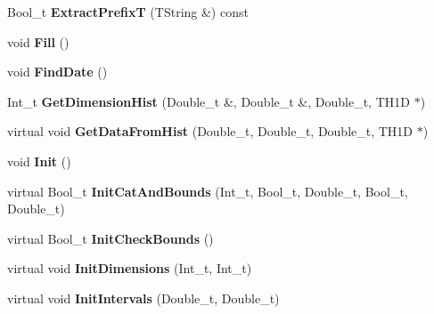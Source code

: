 \begin{DoxyCompactItemize}
\item 
\hypertarget{classTSplineFit_ab98f8db9598a8836d12f52d3aa239d29}{Bool\-\_\-t {\bfseries Extract\-Prefix\-T} (T\-String \&) const }\label{classTSplineFit_ab98f8db9598a8836d12f52d3aa239d29}

\item 
\hypertarget{classTSplineFit_a1d26dd47cf5a5579d25f85eef97d887c}{void {\bfseries Fill} ()}\label{classTSplineFit_a1d26dd47cf5a5579d25f85eef97d887c}

\item 
\hypertarget{classTSplineFit_a93710001f7a21650284d359f9c517b7d}{void {\bfseries Find\-Date} ()}\label{classTSplineFit_a93710001f7a21650284d359f9c517b7d}

\item 
\hypertarget{classTSplineFit_a43cfe894d82a8765ca1aae65bc1057d8}{Int\-\_\-t {\bfseries Get\-Dimension\-Hist} (Double\-\_\-t \&, Double\-\_\-t \&, Double\-\_\-t, T\-H1\-D $\ast$)}\label{classTSplineFit_a43cfe894d82a8765ca1aae65bc1057d8}

\item 
\hypertarget{classTSplineFit_a6f1ea5503e61b7c5219ceaf0ce869469}{virtual void {\bfseries Get\-Data\-From\-Hist} (Double\-\_\-t, Double\-\_\-t, Double\-\_\-t, T\-H1\-D $\ast$)}\label{classTSplineFit_a6f1ea5503e61b7c5219ceaf0ce869469}

\item 
\hypertarget{classTSplineFit_ad184ed1b147d7ac8ba4d0f837636c6a8}{void {\bfseries Init} ()}\label{classTSplineFit_ad184ed1b147d7ac8ba4d0f837636c6a8}

\item 
\hypertarget{classTSplineFit_a07376883cd96d9a26f14204f31ccb6b6}{virtual Bool\-\_\-t {\bfseries Init\-Cat\-And\-Bounds} (Int\-\_\-t, Bool\-\_\-t, Double\-\_\-t, Bool\-\_\-t, Double\-\_\-t)}\label{classTSplineFit_a07376883cd96d9a26f14204f31ccb6b6}

\item 
\hypertarget{classTSplineFit_a89067f9c9aa9d7b3d517fc0780cde71b}{virtual Bool\-\_\-t {\bfseries Init\-Check\-Bounds} ()}\label{classTSplineFit_a89067f9c9aa9d7b3d517fc0780cde71b}

\item 
\hypertarget{classTSplineFit_a8c80e0f2def278c597a8e7c2f1cbe131}{virtual void {\bfseries Init\-Dimensions} (Int\-\_\-t, Int\-\_\-t)}\label{classTSplineFit_a8c80e0f2def278c597a8e7c2f1cbe131}

\item 
\hypertarget{classTSplineFit_aa66cdcfa83c68cb33a30522d42ed9d37}{virtual void {\bfseries Init\-Intervals} (Double\-\_\-t, Double\-\_\-t)}\label{classTSplineFit_aa66cdcfa83c68cb33a30522d42ed9d37}


\end{DoxyCompactItemize}
